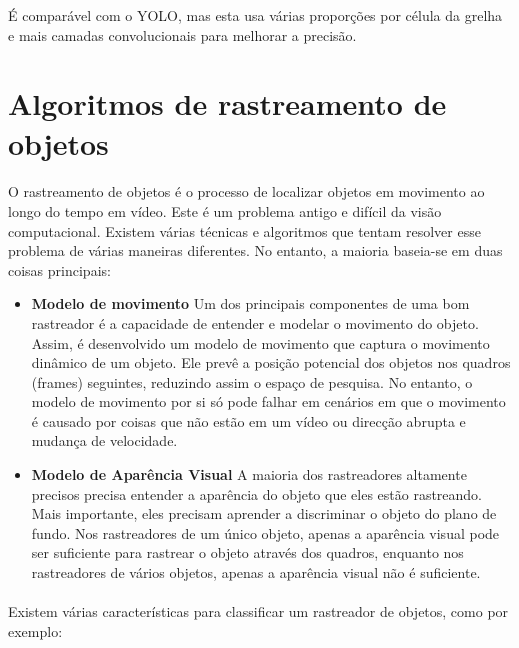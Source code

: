 É comparável com o \ac{YOLO}, mas esta usa várias proporções por célula da grelha e mais camadas convolucionais para melhorar a precisão.



\section{Algoritmos de rastreamento de objetos}
\label{chap2:subsec:algoritmosrastreamento}

\paragraph{}
O rastreamento de objetos é o processo de localizar objetos em movimento ao longo do tempo em vídeo. 
Este é um problema antigo e difícil da visão computacional. Existem várias técnicas e algoritmos que tentam resolver esse problema de várias maneiras diferentes. No entanto, a maioria baseia-se em duas coisas principais:
\begin{itemize}
    \item \textbf{Modelo de movimento}
\newline Um dos principais componentes de uma bom rastreador é a capacidade de entender e modelar o movimento do objeto. Assim, é desenvolvido um modelo de movimento que captura o movimento dinâmico de um objeto. Ele prevê a posição potencial dos objetos nos quadros (frames) seguintes, reduzindo assim o espaço de pesquisa. No entanto, o modelo de movimento por si só pode falhar em cenários em que o movimento é causado por coisas que não estão em um vídeo ou direcção abrupta e mudança de velocidade.
    \item \textbf{Modelo de Aparência Visual}
\newline A maioria dos rastreadores altamente precisos precisa entender a aparência do objeto que eles estão rastreando. Mais importante, eles precisam aprender a discriminar o objeto do plano de fundo. Nos rastreadores de um único objeto, apenas a aparência visual pode ser suficiente para rastrear o objeto através dos quadros, enquanto nos rastreadores de vários objetos, apenas a aparência visual não é suficiente.
\end{itemize}

\paragraph{}
Existem várias características para classificar um rastreador de objetos, como por exemplo:

